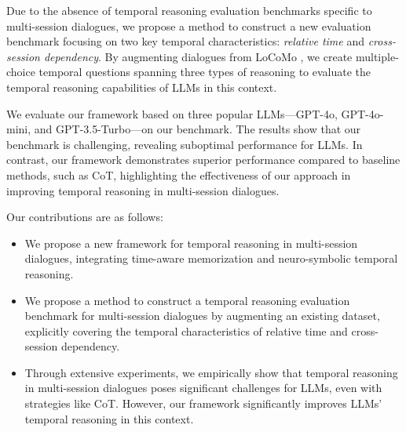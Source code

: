Due to the absence of temporal reasoning evaluation benchmarks specific to multi-session dialogues, we propose a method to construct a new evaluation benchmark focusing on two key temporal characteristics: \textit{relative time} and \textit{cross-session dependency}. By augmenting dialogues from LoCoMo \cite{maharana-etal-2024-evaluating}, we create multiple-choice temporal questions spanning three types of reasoning to evaluate the temporal reasoning capabilities of LLMs in this context.

We evaluate our framework based on three popular LLMs—GPT-4o, GPT-4o-mini, and GPT-3.5-Turbo—on our benchmark. The results show that our benchmark is challenging, revealing suboptimal performance for LLMs. In contrast, our framework demonstrates superior performance compared to baseline methods, such as CoT, highlighting the effectiveness of our approach in improving temporal reasoning in multi-session dialogues.

Our contributions are as follows: 
\begin{itemize} 
    \item We propose a new framework for temporal reasoning in multi-session dialogues, integrating time-aware memorization and neuro-symbolic temporal reasoning. 
    \item We propose a method to construct a temporal reasoning evaluation benchmark for multi-session dialogues by augmenting an existing dataset, explicitly covering the temporal characteristics of relative time and cross-session dependency. 
    \item Through extensive experiments, we empirically show that temporal reasoning in multi-session dialogues poses significant challenges for LLMs, even with strategies like CoT. However, our framework significantly improves LLMs' temporal reasoning in this context. 
\end{itemize}